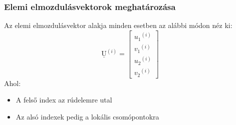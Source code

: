 \documentclass[12pt,a4paper]{article}
\def\vec#1{\underline{\mathrm{#1}}}
\def\i{\left(i\right)}
\begin{document}
\subsubsection{Elemi elmozdulásvektorok meghatározása}
Az elemi elmozdulásvektor alakja minden esetben az alábbi módon néz ki:
\begin{equation}
    \vec{U}^{\i}=
    \begin{bmatrix}
        {u_1}^{\i} \\
        {v_1}^{\i} \\
        {u_2}^{\i} \\
        {v_2}^{\i}
    \end{bmatrix}
\end{equation}
Ahol:
\begin{itemize}
    \item A felső index az rúdelemre utal
    \item Az alsó indexek pedig a lokális csomópontokra
\end{itemize}
\end{document}

